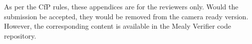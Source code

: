 \appendix

\medskip

As per the CfP rules, these appendices are for the reviewers only.  Would the submission be accepted, they would be removed from the camera ready version.  However, the corresponding content is available in the Mealy Verifier code repository.






